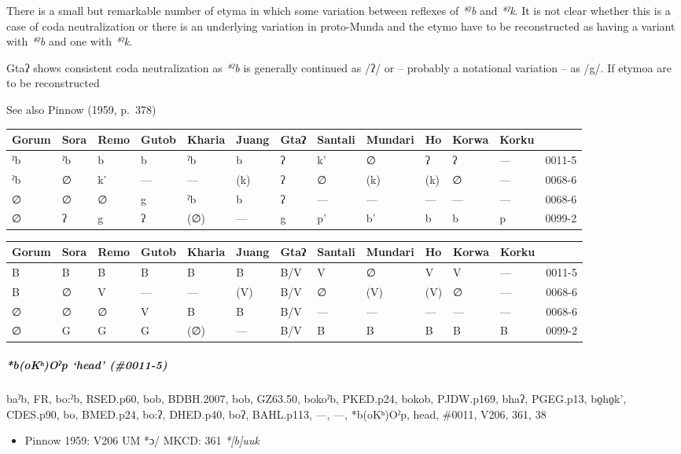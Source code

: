 \documentclass[a4paper,]{article}
\providecommand{\tightlist}{%
  \setlength{\itemsep}{0pt}\setlength{\parskip}{0pt}}
\let\oldsubparagraph\subparagraph
\renewcommand{\subparagraph}[1]{\oldsubparagraph{#1}\mbox{}}
\begin{document}
There is a small but remarkable number of etyma in which some variation
between reflexes of \emph{*ˀb} and \emph{*ˀk}. It is not clear whether
this is a case of coda neutralization or there is an underlying
variation in proto-Munda and the etymo have to be reconstructed as
having a variant with \emph{*ˀb} and one with \emph{*ˀk}.

Gtaʔ shows consistent coda neutralization as \emph{*ˀb} is generally
continued as /ʔ/ or -- probably a notational variation -- as /g/. If
etymoa are to be reconstructed

See also Pinnow (1959, p.~378)

\begin{longtable}[]{@{}lllllllllllll@{}}
\toprule
Gorum & Sora & Remo & Gutob & Kharia & Juang & Gtaʔ & Santali & Mundari
& Ho & Korwa & Korku &\tabularnewline
\midrule
\endhead
ˀb & ˀb & b & b & ˀb & b & ʔ & k' & ∅ & ʔ & ʔ & --- &
0011-5\tabularnewline
ˀb & ∅ & k' & --- & --- & (k) & ʔ & ∅ & (k) & (k) & ∅ & --- &
0068-6\tabularnewline
∅ & ∅ & ∅ & g & ˀb & b & ʔ & --- & --- & --- & --- & --- &
0068-6\tabularnewline
∅ & ʔ & g & ʔ & (∅) & --- & g & p' & b' & b & b & p &
0099-2\tabularnewline
\bottomrule
\end{longtable}

\begin{longtable}[]{@{}lllllllllllll@{}}
\toprule
Gorum & Sora & Remo & Gutob & Kharia & Juang & Gtaʔ & Santali & Mundari
& Ho & Korwa & Korku &\tabularnewline
\midrule
\endhead
B & B & B & B & B & B & B/V & V & ∅ & V & V & --- &
0011-5\tabularnewline
B & ∅ & V & --- & --- & (V) & B/V & ∅ & (V) & (V) & ∅ & --- &
0068-6\tabularnewline
∅ & ∅ & ∅ & V & B & B & B/V & --- & --- & --- & --- & --- &
0068-6\tabularnewline
∅ & G & G & G & (∅) & --- & B/V & B & B & B & B & B &
0099-2\tabularnewline
\bottomrule
\end{longtable}

\subparagraph{\texorpdfstring{\emph{*b(oKʰ)Oˀp} `head'
(\#0011-5)}{*b(oKʰ)Oˀp head (\#0011-5)}}\label{bokux2b0oux2c0p-head-0011-5}

baˀb, FR, bo:ˀb, RSED.p60, bob, BDBH.2007, bob, GZ63.50, bokoˀb,
PKED.p24, bokob, PJDW.p169, bhaʔ, PGEG.p13, bo̠ho̠k', CDES.p90, bo,
BMED.p24, bo:ʔ, DHED.p40, boʔ, BAHL.p113, ---, ---, *b(oKʰ)Oˀp, head,
\#0011, V206, 361, 38

\begin{itemize}
\tightlist
\item
  Pinnow 1959: V206 UM *ɔ/ MKCD: 361 \emph{*{[}b{]}uuk}
\end{itemize}
\end{document}
